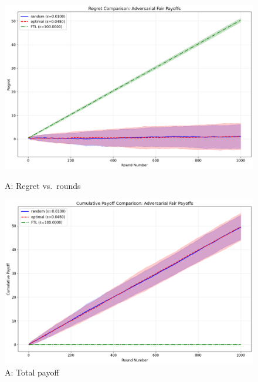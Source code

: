 \documentclass[10pt]{article}
\begin{document}
\begin{figure}[h!]
\centering
\begin{minipage}[t]{0.48\textwidth}
    \centering
    \includegraphics[width=\linewidth]{adversarial_regret_comparison.png}
    \caption*{\footnotesize A: Regret vs.\ rounds}
\end{minipage}\hfill
\begin{minipage}[t]{0.48\textwidth}
    \centering
    \includegraphics[width=\linewidth]{AFR_payoff.png}
    \caption*{\footnotesize A: Total payoff}
\end{minipage}
\end{figure}
\end{document}
